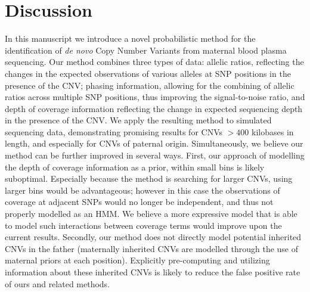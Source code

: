 \section{Discussion}

In this manuscript we introduce a novel probabilistic method for the identification of \textit{de novo} Copy Number Variants from maternal blood plasma sequencing. Our method combines three types of data: allelic ratios, reflecting the changes in the expected observations of various alleles at SNP positions in the presence of the CNV; phasing information, allowing for the combining of allelic ratios across multiple SNP positions, thus improving the signal-to-noise ratio, and depth of coverage information reflecting the change in expected sequencing depth in the presence of the CNV. We apply the resulting method to simulated sequencing data, demonstrating promising results for CNVs $>400$ kilobases in length, and especially for CNVs of paternal origin. 
Simultaneously, we believe our method can be further improved in several ways. First, our approach of modelling the depth of coverage information as a prior, within small bins is likely suboptimal. Especially because the method is searching for larger CNVs, using larger bins would be advantageous; however in this case the observations of coverage at adjacent SNPs would no longer be independent,  and thus not properly modelled as an HMM. We believe a more expressive model that is able to model such interactions between coverage terms would improve upon the current results. Secondly, our method does not directly model potential inherited CNVs in the father (maternally inherited CNVs are modelled through the use of maternal priors at each position). Explicitly pre-computing and utilizing information about these inherited CNVs is likely to reduce the false positive rate of ours and related methods.

